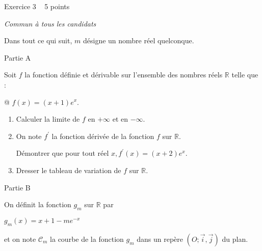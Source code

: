 
%
\begin{h2}Exercice 3   5 points\end{h2}
\textit{Commun à tous les candidats}
\par
Dans tout ce qui suit, $m$ désigne un nombre réel quelconque.
\begin{h3}Partie A\end{h3}
Soit $f$ la fonction définie et dérivable sur l'ensemble des nombres réels $\mathbb{R}$ telle que :

\begin{center}

\end{center}@
$ f\left(x\right)=\left(x+1\right)e^{x}.$
\begin{enumerate}
     \item
     Calculer la limite de $f$ en $+ \infty $ et en $-\infty $.
     \item
     On note $f^{\prime}$ la fonction dérivée de la fonction $f$ sur $\mathbb{R}$.
     \par
     Démontrer que pour tout réel $x, f^{\prime}\left(x\right)=\left(x+2\right)e^{x}$.
     \item
     Dresser le tableau de variation de $f$ sur $\mathbb{R}$.
\end{enumerate}
\begin{h3}Partie B\end{h3}
On définit la fonction $g_{m}$ sur $\mathbb{R}$ par
\par
$g_{m}\left(x\right)=x+1-me^{-x}$
\par
et on note $\mathscr C_{m}$ la courbe de la fonction $g_{m}$ dans un repère $\left(O; \vec{i}, \vec{j}\right)$ du plan.
